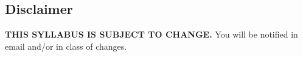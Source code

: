\documentclass[margin,line,pifont,palatino,courier]{res}
\newenvironment{list2}{
  \begin{list}{$\bullet$}{%
      \setlength{\itemsep}{0in}
      \setlength{\parsep}{0in} \setlength{\parskip}{0in}
      \setlength{\topsep}{0in} \setlength{\partopsep}{0in}
      \setlength{\leftmargin}{0.2in}}}{\end{list}}
\begin{document}
\begin{resume}




\section{\sc Disclaimer} {\bf THIS SYLLABUS IS SUBJECT TO CHANGE.} You will be notified in email and/or in class of changes. %

\end{resume}
\end{document}
